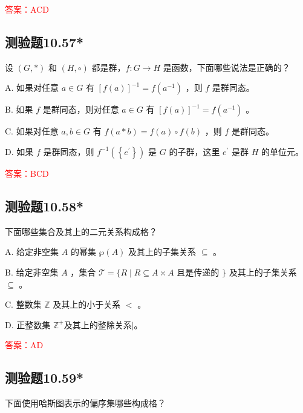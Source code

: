 \documentclass[UTF8, heading=true]{ctexart}
\begin{document}
\textcolor{red}{答案：ACD}


\subsection{测验题10.57*}

设 $(G, *)$ 和 $(H, \circ)$ 都是群，$f: G \rightarrow H$ 是函数，下面哪些说法是正确的？

A. 如果对任意 $a \in G$ 有 $[f(a)]^{-1}=f\left(a^{-1}\right)$ ，则 $f$ 是群同态。

B. 如果 $f$ 是群同态，则对任意 $a \in G$ 有 $[f(a)]^{-1}=f\left(a^{-1}\right)$ 。

C. 如果对任意 $a, b \in G$ 有 $f(a * b)=f(a) \circ f(b)$ ，则 $f$ 是群同态。

D. 如果 $f$ 是群同态，则 $f^{-1}\left(\left\{e^{\prime}\right\}\right)$ 是 $G$ 的子群，这里 $e^{\prime}$ 是群 $H$ 的单位元。

\textcolor{red}{答案：BCD}

\subsection{测验题10.58*}

下面哪些集合及其上的二元关系构成格？

A. 给定非空集 $A$ 的幂集 $\wp(A)$ 及其上的子集关系 $\subseteq$ 。

B. 给定非空集 $A$ ，集合 $\mathcal{T}=\{R \mid R \subseteq A \times A$ 且是传递的 $\}$ 及其上的子集关系 $\subseteq$ 。

C. 整数集 $\mathbb{Z}$ 及其上的小于关系 $<$ 。

D. 正整数集 $\mathbb{Z}^{+}$及其上的整除关系$\mid$。

\textcolor{red}{答案：AD}

\subsection{测验题10.59*}

下面使用哈斯图表示的偏序集哪些构成格？
\end{document}

